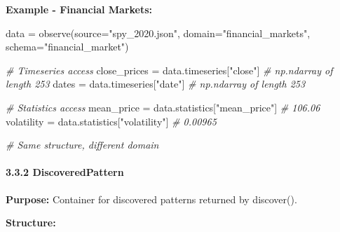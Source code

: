 \documentclass[
]{article}
\newenvironment{Shaded}{}{}
\newcommand{\CommentTok}[1]{\textcolor[rgb]{0.38,0.63,0.69}{\textit{#1}}}
\newcommand{\NormalTok}[1]{#1}
\newcommand{\OperatorTok}[1]{\textcolor[rgb]{0.40,0.40,0.40}{#1}}
\newcommand{\StringTok}[1]{\textcolor[rgb]{0.25,0.44,0.63}{#1}}
\begin{document}
\textbf{Example - Financial Markets:}

\begin{Shaded}
\begin{Highlighting}[]
\NormalTok{data }\OperatorTok{=}\NormalTok{ observe(source}\OperatorTok{=}\StringTok{"spy\_2020.json"}\NormalTok{, domain}\OperatorTok{=}\StringTok{"financial\_markets"}\NormalTok{, schema}\OperatorTok{=}\StringTok{"financial\_market"}\NormalTok{)}

\CommentTok{\# Timeseries access}
\NormalTok{close\_prices }\OperatorTok{=}\NormalTok{ data.timeseries[}\StringTok{"close"}\NormalTok{]        }\CommentTok{\# np.ndarray of length 253}
\NormalTok{dates }\OperatorTok{=}\NormalTok{ data.timeseries[}\StringTok{"date"}\NormalTok{]                }\CommentTok{\# np.ndarray of length 253}

\CommentTok{\# Statistics access}
\NormalTok{mean\_price }\OperatorTok{=}\NormalTok{ data.statistics[}\StringTok{"mean\_price"}\NormalTok{]     }\CommentTok{\# 106.06}
\NormalTok{volatility }\OperatorTok{=}\NormalTok{ data.statistics[}\StringTok{"volatility"}\NormalTok{]     }\CommentTok{\# 0.00965}

\CommentTok{\# Same structure, different domain}
\end{Highlighting}
\end{Shaded}

\paragraph{3.3.2 DiscoveredPattern}\label{discoveredpattern}

\textbf{Purpose:} Container for discovered patterns returned by
discover().

\textbf{Structure:}
\end{document}
